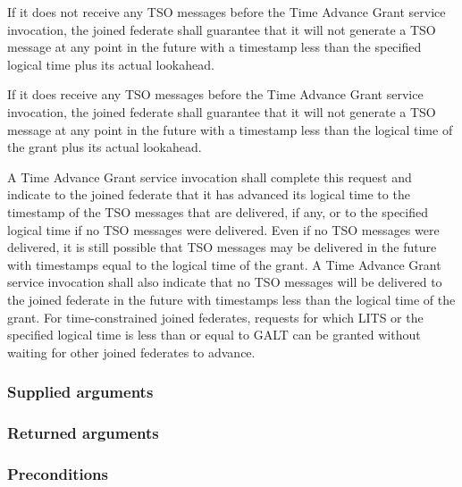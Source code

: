 \begin{compactstdpage}

    If it does not receive any TSO messages before the Time Advance Grant \rtiinitiated{} service invocation, the joined federate shall guarantee that it will not generate a TSO message at any point in the future with a timestamp less than the specified logical time plus its actual lookahead.

    If it does receive any TSO messages before the Time Advance Grant \rtiinitiated{} service invocation, the joined federate shall guarantee that it will not generate a TSO message at any point in the future with a timestamp less than the logical time of the grant plus its actual lookahead.

    A Time Advance Grant \rtiinitiated{} service invocation shall complete this request and indicate to the joined federate that it has advanced its logical time to the timestamp of the TSO messages that are delivered, if any, or to the specified logical time if no TSO messages were delivered. Even if no TSO messages were delivered, it is still possible that TSO messages may be delivered in the future with timestamps equal to the logical time of the grant. A Time Advance Grant \rtiinitiated{} service invocation shall also indicate that no TSO messages will be delivered to the joined federate in the future with timestamps less than the logical time of the grant. For time-constrained joined federates, requests for which LITS or the specified logical time is less than or equal to GALT can be granted without waiting for other joined federates to advance.

    \subsubsection{Supplied arguments}


    \subsubsection{Returned arguments}


    \subsubsection{Preconditions}



\end{compactstdpage}
